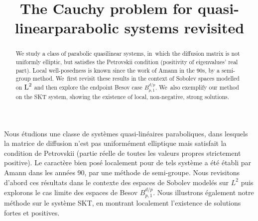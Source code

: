 \documentclass[JEP,XML,SOM,Unicode,published]{cedram}
\theoremstyle{definition}
\begin{document}
\title{The Cauchy problem for quasi-linear\nobreakspace parabolic systems revisited}

\author[\initial{I.} \lastname{Gallagher}]{ }
\address{DMA, École normale supérieure, CNRS, PSL University,\\
75005 Paris, France}
\address{\& UFR de mathématiques, Université Paris Cité,\\
75013 Paris, France}

\author[\initial{A.} \lastname{Moussa}]{ }
\address{DMA, École normale supérieure, CNRS, PSL University,\\
75005 Paris, France}
\address{\& LJLL, Sorbonne Université, Université Paris Cité,\\
75005 Paris, France}

\begin{abstract}
We study a class of parabolic quasilinear systems, in~which the diffusion matrix is not uniformly elliptic, but satisfies the Petrovskii condition (positivity of eigenvalues' real part). Local well-posedness is known since the work of Amann in the 90s, by a semi-group method. We~first revisit these results in the context of Sobolev spaces modelled on $\textnormal{L}^2$ and then explore the endpoint Besov case $B^{d/p}_{p,1}$. We~also exemplify our method on the SKT system, showing the existence of local, non-negative, strong solutions.
\end{abstract}





\begin{altabstract}
Nous étudions une classe de systèmes quasi-linéaires paraboliques, dans lesquels la matrice de diffusion n'est pas uniformément elliptique mais satisfait la condition de Petrovskii (partie réelle de toutes les valeurs propres strictement positive). Le caractère bien posé localement pour de tels système a été établi par Amann dans les années 90, par une méthode de semi-groupe. Nous revisitons d'abord ces résultats dans le contexte des espaces de Sobolev modelés sur $L^2$ puis explorons le cas limite des espaces de Besov $B^{d/p}_{p,1}$. Nous illustrons également notre méthode sur le système SKT, en montrant localement l'existence de solutions fortes et positives.
\end{altabstract}
\end{document}

